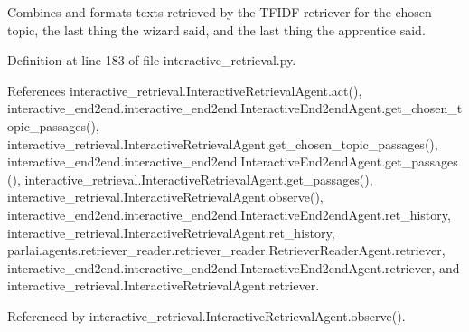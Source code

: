 \begin{DoxyVerb}Combines and formats texts retrieved by the TFIDF retriever for the
chosen topic, the last thing the wizard said, and the last thing the
apprentice said.
\end{DoxyVerb}
 

Definition at line 183 of file interactive\+\_\+retrieval.\+py.



References interactive\+\_\+retrieval.\+Interactive\+Retrieval\+Agent.\+act(), interactive\+\_\+end2end.\+interactive\+\_\+end2end.\+Interactive\+End2end\+Agent.\+get\+\_\+chosen\+\_\+topic\+\_\+passages(), interactive\+\_\+retrieval.\+Interactive\+Retrieval\+Agent.\+get\+\_\+chosen\+\_\+topic\+\_\+passages(), interactive\+\_\+end2end.\+interactive\+\_\+end2end.\+Interactive\+End2end\+Agent.\+get\+\_\+passages(), interactive\+\_\+retrieval.\+Interactive\+Retrieval\+Agent.\+get\+\_\+passages(), interactive\+\_\+retrieval.\+Interactive\+Retrieval\+Agent.\+observe(), interactive\+\_\+end2end.\+interactive\+\_\+end2end.\+Interactive\+End2end\+Agent.\+ret\+\_\+history, interactive\+\_\+retrieval.\+Interactive\+Retrieval\+Agent.\+ret\+\_\+history, parlai.\+agents.\+retriever\+\_\+reader.\+retriever\+\_\+reader.\+Retriever\+Reader\+Agent.\+retriever, interactive\+\_\+end2end.\+interactive\+\_\+end2end.\+Interactive\+End2end\+Agent.\+retriever, and interactive\+\_\+retrieval.\+Interactive\+Retrieval\+Agent.\+retriever.



Referenced by interactive\+\_\+retrieval.\+Interactive\+Retrieval\+Agent.\+observe().

